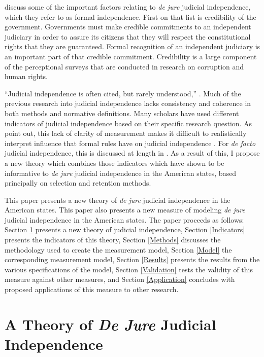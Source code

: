 \documentclass[12pt]{article}
\begin{document}
\citet{Hayo2007} discuss some of the important factors relating to \textit{de jure} judicial independence, which they refer to as formal independence.  First on that list is credibility of the government.  Governments must make credible commitments to an independent judiciary in order to assure its citizens that they will respect the constitutional rights that they are guaranteed.  Formal recognition of an independent judiciary is an important part of that credible commitment.   Credibility is a large component of the perceptional surveys that are conducted in research on corruption and human rights.

``Judicial independence is often cited, but rarely understood,'' \citep[1]{Tiede2006}.  Much of the previous research into judicial independence lacks consistency and coherence in both methods and normative definitions.  Many scholars have used different indicators of judicial independence based on their specific research question.  As \citeauthor{Rios2014} point out, this lack of clarity of measurement makes it difficult to realistically interpret influence that formal rules have on judicial independence \citep[2]{Rios2014}.  For \textit{de facto} judicial independence, this is discussed at length in \cite{Rios2014}.  As a result of this, I propose a new theory which combines those indicators which have shown to be informative to \textit{de jure} judicial independence in the American states, based principally on selection and retention methods.

This paper presents a new theory of \textit{de jure} judicial independence in the American states.  This paper also presents a new measure of modeling \textit{de jure} judicial independence in the American states.  The paper proceeds as follows: Section \ref{Theory} presents a new theory of judicial independence, Section \ref{Indicators} presents the indicators of this theory, Section \ref{Methods} discusses the methodology used to create the measurement model, Section \ref{Model} the corresponding measurement model, Section \ref{Results} presents the results from the various specifications of the model, Section \ref{Validation} tests the validity of this measure against other measures, and Section \ref{Application} concludes with proposed applications of this measure to other research.	

\section{A Theory of \textit{De Jure} Judicial Independence}\label{Theory}
\end{document}

